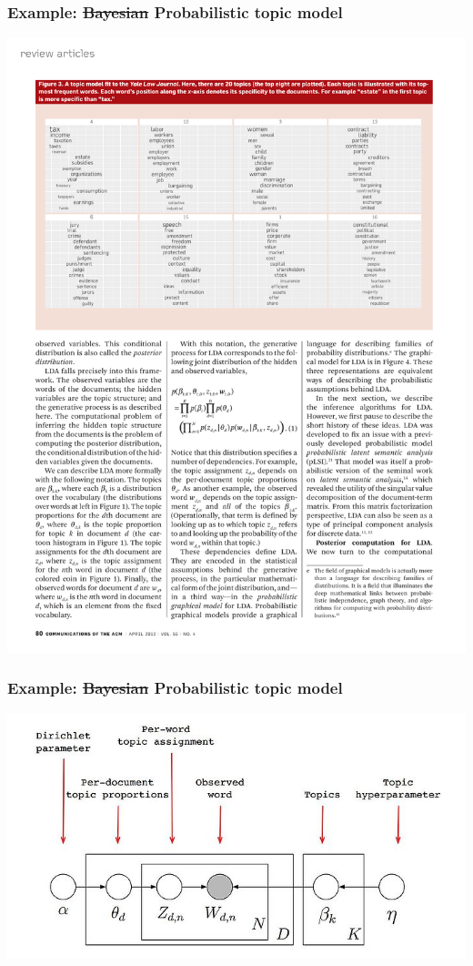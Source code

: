 \documentclass[18pt]{beamer}
\begin{document}
\begin{frame}
\frametitle{Example:  \st{Bayesian} Probabilistic topic model}
\vspace*{.15\baselineskip}

\hspace*{-.03\linewidth}
\includegraphics[width=1.04\linewidth]{Figure/lda_on_law_journal}
\end{frame}


\begin{frame}
\frametitle{Example:  \st{Bayesian} Probabilistic topic model}
\includegraphics[width=\linewidth]{Figure/lda_dag}
\end{frame}
\end{document}
